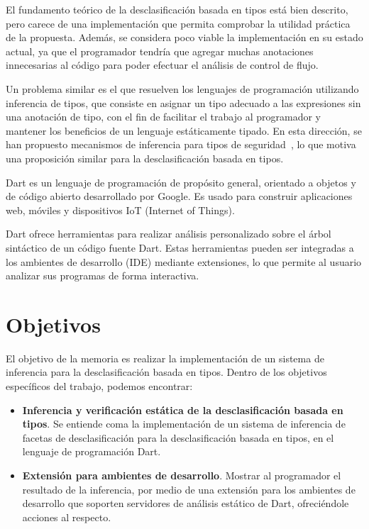 \begin{intro}
	El fundamento teórico de la desclasificación basada en tipos está bien descrito, pero carece de una implementación que permita comprobar la utilidad práctica de la propuesta. Además, se considera poco viable la implementación en su estado actual, ya que el programador tendría que agregar muchas anotaciones innecesarias al código para poder efectuar el análisis de control de flujo.

	Un problema similar es el que resuelven los lenguajes de programación utilizando inferencia de tipos, que consiste en asignar un tipo adecuado a las expresiones sin una anotación de tipo, con el fin de facilitar el trabajo al programador y mantener los beneficios de un lenguaje estáticamente tipado. En esta dirección, se han propuesto mecanismos de inferencia para tipos de seguridad~\cite{Pottier}, lo que motiva una proposición similar para la desclasificación basada en tipos.

	Dart es un lenguaje de programación de propósito general, orientado a objetos y de código abierto desarrollado por Google. Es usado para construir aplicaciones web, móviles y dispositivos IoT (Internet of Things).

	Dart ofrece herramientas para realizar análisis personalizado sobre el árbol sintáctico de un código fuente Dart. Estas herramientas pueden ser integradas a los ambientes de desarrollo (IDE) mediante extensiones, lo que permite al usuario analizar sus programas de forma interactiva.

	\section{Objetivos}
	El objetivo de la memoria es realizar la implementación de un sistema de inferencia para la desclasificación basada en tipos. Dentro de los objetivos específicos del trabajo, podemos encontrar:

	\begin{itemize}
	\item \textbf{Inferencia y verificación estática de la desclasificación basada en tipos}. Se entiende coma la implementación de un sistema de inferencia de facetas de desclasificación para la desclasificación basada en tipos, en el lenguaje de programación Dart.

	\item \textbf{Extensión para ambientes de desarrollo}. Mostrar al programador el resultado de la inferencia, por medio de una extensión para los ambientes de desarrollo que soporten servidores de análisis estático de Dart, ofreciéndole acciones al respecto.


\end{itemize}
\end{intro}
